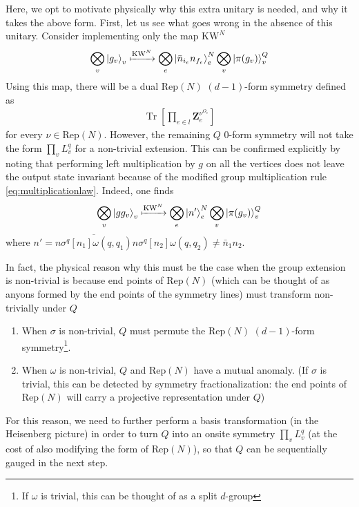 \documentclass[nofootinbib,prx,twocolumn,showpacs,superscriptaddress,notitlepage,amsmath,amssymb]{revtex4-2}
\theoremstyle{definition}
\def\KW{\text{KW}}
\def\Rep{\text{Rep}}
\def\ket#1{\mathinner{|{#1}\rangle}}
\def\bs#1{\boldsymbol{#1}}
\DeclareMathOperator{\Tr}{Tr}
\begin{document}
Here, we opt to motivate physically why this extra unitary is needed, and why it takes the above form. First, let us see what goes wrong in the absence of this unitary. Consider implementing only the map $\KW^N$
\begin{align}
\bigotimes_v \ket{g_v}_v \xmapsto[]{\KW^{N}} \bigotimes_e  \ket{\bar n_{i_e}n_{f_e}}^N_e  \bigotimes_v \ket{\pi(g_v)}^Q_v 
\label{equ:KWonstatesN}
\end{align}
Using this map, there will be a dual $\Rep(N)$ $(d-1)$-form symmetry defined as
\begin{align}
    \Tr \left[\prod_{e \in l}   {\bs Z}^{\nu^{O_e}}_e \right] \label{eq:KWNRepNsymm}
\end{align}
for every $\nu \in \Rep(N)$. However, the remaining $Q$ 0-form symmetry will not take the form $\prod_v L^q_v$ for a non-trivial extension. This can be confirmed explicitly by noting that performing left multiplication by $g$ on all the vertices does not leave the output state invariant because of the modified group multiplication rule \eqref{eq:multiplicationlaw}. Indeed, one finds
\begin{align}
\bigotimes_v \ket{gg_v}_v \xmapsto[]{\KW^{N}} \bigotimes_e  \ket{n'}^N_e  \bigotimes_v \ket{\pi(g_v)}^Q_v 
\label{equ:KWonstatesNGgaction}
\end{align}
where $n' =\overline{n\sigma^q[n_1]\omega(q,q_1)}n\sigma^q[n_2]\omega(q,q_2) \ne \bar n_1n_2$.

In fact, the physical reason why this must be the case when the group extension is non-trivial is because end points of $\Rep(N)$ (which can be thought of as anyons formed by the end points of the symmetry lines) must transform non-trivially under $Q$ \cite{BarkeshliBondersonChengWang2019,Hermele2014,TarantinoLinderFidkowski2016}
\begin{enumerate}
    \item When $\sigma$ is non-trivial, $Q$ must permute the $\Rep(N)$ $(d-1)$-form symmetry\footnote{If $\omega$ is trivial, this can be thought of as a split $d$-group}.
    \item When $\omega$ is non-trivial, $Q$ and $\Rep(N)$ have a mutual anomaly\cite{Tachikawa_2020}. (If $\sigma$ is trivial, this can be detected by symmetry fractionalization: the end points of $\Rep(N)$ will carry a projective representation under $Q$)
\end{enumerate}

For this reason, we need to further perform a basis transformation (in the Heisenberg picture) in order to turn $Q$ into an onsite symmetry $\prod_v L^q_v$ (at the cost of also modifying the form of $\Rep(N)$), so that $Q$ can be sequentially gauged in the next step.
\end{document}
